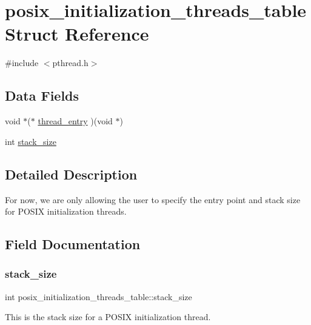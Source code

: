 \hypertarget{structposix__initialization__threads__table}{}\section{posix\+\_\+initialization\+\_\+threads\+\_\+table Struct Reference}
\label{structposix__initialization__threads__table}


{\ttfamily \#include $<$pthread.\+h$>$}

\subsection*{Data Fields}
\begin{DoxyCompactItemize}
\item 
void $\ast$($\ast$ \mbox{\hyperlink{structposix__initialization__threads__table_acd0fa172dbc682349f995797a9d4aba3}{thread\+\_\+entry}} )(void $\ast$)
\item 
int \mbox{\hyperlink{structposix__initialization__threads__table_a46e60fd5d7fa3b2275ada1630695bd6f}{stack\+\_\+size}}
\end{DoxyCompactItemize}


\subsection{Detailed Description}
For now, we are only allowing the user to specify the entry point and stack size for P\+O\+S\+IX initialization threads. 

\subsection{Field Documentation}
\mbox{\label{structposix__initialization__threads__table_a46e60fd5d7fa3b2275ada1630695bd6f}} 
\subsubsection{\texorpdfstring{stack\_size}{stack\_size}}
{\footnotesize\ttfamily int posix\+\_\+initialization\+\_\+threads\+\_\+table\+::stack\+\_\+size}

This is the stack size for a P\+O\+S\+IX initialization thread. \mbox{\label{structposix__initialization__threads__table_acd0fa172dbc682349f995797a9d4aba3}} 
